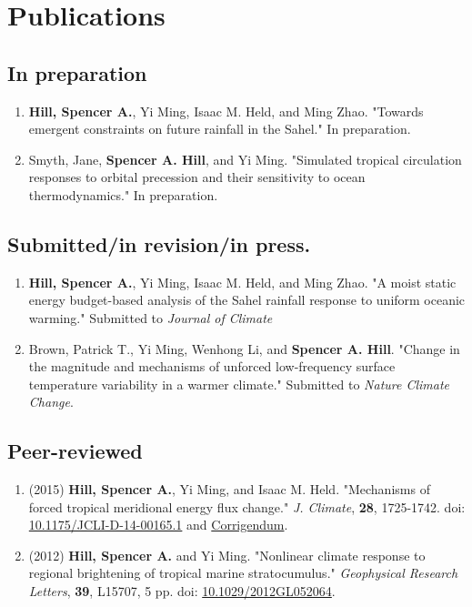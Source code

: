 \documentclass{article}
\begin{document}
\section*{Publications}
\label{sec:orgheadline12}
\subsection*{In preparation}
\label{sec:orgheadline6}
\begin{enumerate}
\item \textbf{Hill, Spencer A.}, Yi Ming, Isaac M. Held, and Ming Zhao.  "Towards emergent
constraints on future rainfall in the Sahel."  In preparation.
\item Smyth, Jane, \textbf{Spencer A. Hill}, and Yi Ming.  "Simulated tropical circulation
responses to orbital precession and their sensitivity to ocean
thermodynamics."  In preparation.
\end{enumerate}
\subsection*{Submitted/in revision/in press.}
\label{sec:orgheadline7}
\begin{enumerate}
\item \textbf{Hill, Spencer A.}, Yi Ming, Isaac M. Held, and Ming Zhao.  "A moist static
energy budget-based analysis of the Sahel rainfall response to uniform
oceanic warming."  Submitted to \emph{Journal of Climate}
\item Brown, Patrick T., Yi Ming, Wenhong Li, and \textbf{Spencer A. Hill}.  "Change in the
magnitude and mechanisms of unforced low-frequency surface temperature
variability in a warmer climate."  Submitted to \emph{Nature Climate Change}.
\end{enumerate}
\subsection*{Peer-reviewed}
\label{sec:orgheadline8}
\begin{enumerate}
\item (2015) \textbf{Hill, Spencer A.}, Yi Ming, and Isaac M. Held. "Mechanisms of forced tropical
meridional energy flux change."  \emph{J. Climate}, \textbf{28}, 1725-1742.  doi:
\href{http://dx.doi.org/10.1175/JCLI-D-14-00165.1}{10.1175/JCLI-D-14-00165.1} and \href{http://journals.ametsoc.org/doi/abs/10.1175/JCLI-D-16-0485.1}{Corrigendum}.
\item (2012) \textbf{Hill, Spencer A.} and Yi Ming. "Nonlinear climate response to regional
brightening of tropical marine stratocumulus."  \emph{Geophysical Research Letters},
\textbf{39}, L15707, 5 pp. doi: \href{http://dx.doi.org/10.1029/2012GL052064}{10.1029/2012GL052064}.
\end{enumerate}
\end{document}
